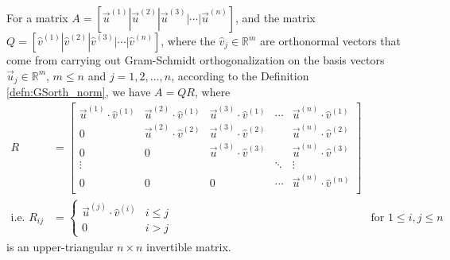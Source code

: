 \begin{proper}
\label{proper:QRdecompose}
For a matrix $A = [\vec{u}^{(1)}|\vec{u}^{(2)}|\vec{u}^{(3)}|\cdots|\vec{u}^{(n)}]$, and the matrix $Q = [\hat{v}^{(1)}|\hat{v}^{(2)}|\hat{v}^{(3)}|\cdots|\hat{v}^{(n)}]$, where the $\hat{v}_j \in \mathbb{R}^m$ are orthonormal vectors that come from carrying out Gram-Schmidt orthogonalization on the basis vectors $\vec{u}_j \in \mathbb{R}^m$, $m \leq n$ and $j = 1,2,\ldots,n$, according to the Definition \ref{defn:GSorth_norm}, we have $A = QR$, where
\begin{align*}
R &= 
\begin{bmatrix}
\vec{u}^{(1)} \cdot \hat{v}^{(1)} & \vec{u}^{(2)} \cdot \hat{v}^{(1)} & \vec{u}^{(3)} \cdot \hat{v}^{(1)} & \cdots & \vec{u}^{(n)} \cdot \hat{v}^{(1)} \\
0 & \vec{u}^{(2)} \cdot \hat{v}^{(2)} & \vec{u}^{(3)} \cdot \hat{v}^{(2)} &  & \vec{u}^{(n)} \cdot \hat{v}^{(2)} \\
0 & 0 & \vec{u}^{(3)} \cdot \hat{v}^{(3)} &  & \vec{u}^{(n)} \cdot \hat{v}^{(3)} \\
\vdots & & & \ddots & \vdots\\
0 & 0 & 0 & \cdots & \vec{u}^{(n)} \cdot \hat{v}^{(n)} \\
\end{bmatrix} \\
\text{i.e. } R_{ij} &= 
\begin{cases}
\vec{u}^{(j)} \cdot \hat{v}^{(i)} & i \leq j \\
0 & i > j
\end{cases}
& \text{for $1 \leq i, j \leq n$}
\end{align*}
is an upper-triangular $n \times n$ invertible matrix.
\end{proper}

